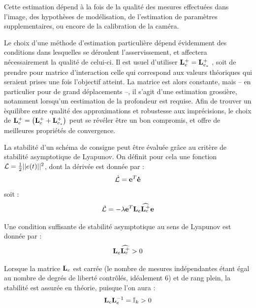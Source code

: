 Cette estimation d\'epend \`a la fois de la qualit\'e des mesures effectu\'ees 
dans l'image, des hypoth\`eses de mod\'elisation, de l'estimation de 
param\`etres supplementaires, ou encore de la calibration de la cam\'era.

Le choix d'une m\'ethode d'estimation particuli\`ere d\'epend \'evidemment des 
conditions dans lesquelles se d\'eroulent l'asservissement, et affectera 
n\'ecessai\-rement la qualit\'e de celui-ci. Il est usuel d'utiliser ${{\bf 
L}_e^+} = {{\bf L}_{e_*}^+}$ \cite{espiau1992}, soit de prendre pour matrice 
d'interaction celle qui correspond aux valeurs th\'eoriques qui seraient prises 
une fois l'objectif atteint. La matrice est alors constante, mais -- en 
particulier pour de grand d\'eplacements --, il s'agit d'une estimation 
grossi\`ere, notamment lorsqu'un eestimation de la profondeur est requise. Afin 
de trouver un \`equilibre entre qualit\'e des approximations et robustesse aux 
impr\'ecisions, le choix de ${{\bf L}_e^+} = \left ( {{\bf L}_{e}^+} + {{\bf 
L}_{e_*}^+} \right )$ \cite{malis2004} peut se r\'ev\'eler \^etre un bon 
compromis, et offre de meilleures propri\'et\'es de convergence.

La stabilit\'e d'un sch\'ema de consigne peut \^etre \'evalu\'ee gr\^ace au 
crit\`ere de stabilit\'e asymptotique de Lyapunov. On d\'efinit pour cela une 
fonction $\mathcal L = \frac 1 2 ||{\bf }e(t)||^2$, dont la d\'eriv\'ee est 
donn\'ee par :
\begin{equation}
\dot {\mathcal L} = {\bf e}^T {\bf \dot e} 
\label{chap01:eq18b}
\end{equation}
soit :
\begin{equation}
\dot {\mathcal L} = -\lambda {\bf e}^T {\bf L}_e \widehat {{\bf L}^+_e} {\bf e} 
\label{chap01:eq18c}
\end{equation}

Une condition suffisante de stabilit\'e asymptotique au sens de Lyapunov est 
donn\'ee par :
\begin{equation}
{\bf L}_e \widehat {{\bf L}^+_e} > 0
\label{chap01:eq18d}
\end{equation}

Lorsque la matrice ${\bf L}_e$ est carr\'ee (le nombre de mesures 
ind\'ependantes \'etant \'egal au nombre de degr\'es de libert\'e 
contr\^ol\'es, id\'ealement 6) et de rang plein, la stabilit\'e est assur\'ee 
en th\'eorie, puisque l'on aura :
\begin{equation}
{\bf L}_e {{\bf L}^{-1}_e} = \mathbb I_k > 0
\label{chap01:eq18e}
\end{equation}

